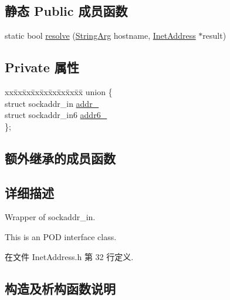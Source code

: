 \subsection*{静态 Public 成员函数}
\begin{DoxyCompactItemize}
\item 
static bool \hyperlink{classmuduo_1_1net_1_1InetAddress_a5d40420d8fdfc726444cfc5a5d2c1cad}{resolve} (\hyperlink{classmuduo_1_1StringArg}{String\+Arg} hostname, \hyperlink{classmuduo_1_1net_1_1InetAddress}{Inet\+Address} $\ast$result)
\end{DoxyCompactItemize}
\subsection*{Private 属性}
\begin{DoxyCompactItemize}
\item 
\begin{tabbing}
xx\=xx\=xx\=xx\=xx\=xx\=xx\=xx\=xx\=\kill
union \{\\
\>struct sockaddr\_in \hyperlink{classmuduo_1_1net_1_1InetAddress_a6d6d32117d52a72865bf26dc7e0bc646}{addr\_}\\
\>struct sockaddr\_in6 \hyperlink{classmuduo_1_1net_1_1InetAddress_a8a6c9c35189ae20ae01502f1d0e266e5}{addr6\_}\\
\}; \\

\end{tabbing}\end{DoxyCompactItemize}
\subsection*{额外继承的成员函数}


\subsection{详细描述}
Wrapper of sockaddr\+\_\+in.

This is an P\+OD interface class. 

在文件 Inet\+Address.\+h 第 32 行定义.



\subsection{构造及析构函数说明}
\mbox{\label{classmuduo_1_1net_1_1InetAddress_a0665e9d84a1b2d745f9a029d383bb39b}} 
